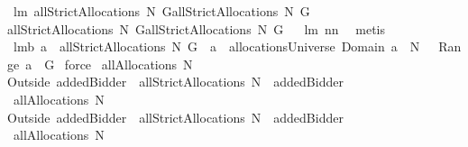 \begin{isabellebody}
\isamarkupfalse%
\ lm{}{}{\isacharcolon}\ {\isachardoublequoteopen}allStrictAllocations{\isacharprime}\ N\ G{\isacharequal}allStrictAllocations{\isacharprime}{\isacharprime}\ N\ G\ {\isacharampersand}\ \isanewline
allStrictAllocations{\isacharprime}\ N\ G{\isacharequal}allStrictAllocations{\isacharprime}{\isacharprime}{\isacharprime}\ N\ G{\isachardoublequoteclose}%
\isadelimproof
\ %
\endisadelimproof
%
\isatagproof
{}\isamarkupfalse%
\ lm{}{}\ nn{}{}\ \isamarkupfalse%
\ metis%
\endisatagproof
{\isafoldproof}%
%
\isadelimproof
%
\endisadelimproof
\isanewline
{}\isamarkupfalse%
\ lm{}{}b{\isacharcolon}\ {\isachardoublequoteopen}{\isacharparenleft}a\ {\isasymin}\ allStrictAllocations{\isacharprime}{\isacharprime}{\isacharprime}\ N\ G{\isacharparenright}\ {\isacharequal}\ {\isacharparenleft}a\ {\isasymin}\ allocationsUniverse{\isacharampersand}\ Domain\ a\ {\isasymsubseteq}\ N\ {\isacharampersand}\ {\isasymUnion}\ Range\ a\ {\isacharequal}\ G{\isacharparenright}{\isachardoublequoteclose}\isanewline
%
\isadelimproof
%
\endisadelimproof
%
\isatagproof
{}\isamarkupfalse%
\ force%
\endisatagproof
{\isafoldproof}%
%
\isadelimproof
\isanewline
%
\endisadelimproof
{}\isamarkupfalse%
\ {\isachardoublequoteopen}allAllocations{\isacharprime}\ N\ {\isasymOmega}\ {\isacharequal}{\isacharequal}\ \isanewline
{\isacharparenleft}Outside{\isacharprime}\ {\isacharbraceleft}addedBidder{\isacharprime}{\isacharbraceright}{\isacharparenright}\ {\isacharbackquote}\ {\isacharparenleft}allStrictAllocations{\isacharprime}\ {\isacharparenleft}N\ {\isasymunion}\ {\isacharbraceleft}addedBidder{\isacharprime}{\isacharbraceright}{\isacharparenright}\ {\isasymOmega}{\isacharparenright}{\isachardoublequoteclose}\isanewline
{}\isamarkupfalse%
\ {\isachardoublequoteopen}allAllocations{\isacharprime}{\isacharprime}\ N\ {\isasymOmega}\ {\isacharequal}{\isacharequal}\ \isanewline
{\isacharparenleft}Outside{\isacharprime}\ {\isacharbraceleft}addedBidder{\isacharprime}{\isacharbraceright}{\isacharparenright}\ {\isacharbackquote}\ {\isacharparenleft}allStrictAllocations{\isacharprime}{\isacharprime}\ {\isacharparenleft}N\ {\isasymunion}\ {\isacharbraceleft}addedBidder{\isacharprime}{\isacharbraceright}{\isacharparenright}\ {\isasymOmega}{\isacharparenright}{\isachardoublequoteclose}\isanewline
{}\isamarkupfalse%
\ {\isachardoublequoteopen}allAllocations{\isacharprime}{\isacharprime}{\isacharprime}\ N\ {\isasymOmega}\ {\isacharequal}{\isacharequal}\ \isanewline

\end{isabellebody}
